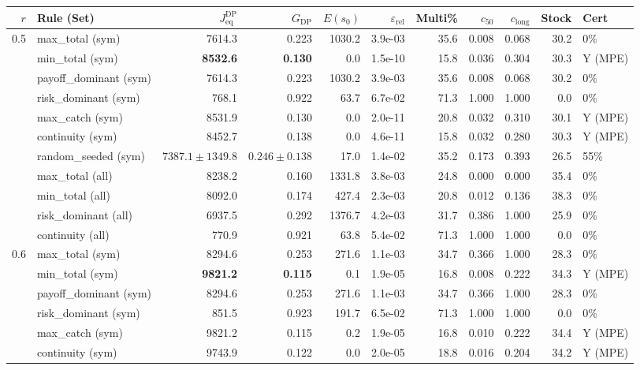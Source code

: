 \begin{tabular}{rlrrrrrrrrl}
\toprule
$r$ & Rule (Set) & $J_{\text{eq}}^{\text{DP}}$ & $G_{\text{DP}}$ & $E(s_0)$ & $\varepsilon_{\text{rel}}$ & Multi\% & $c_{50}$ & $c_{\text{long}}$ & Stock & Cert \\
\midrule
0.5 & max\_total (sym) & 7614.3 & 0.223 & 1030.2 & 3.9e-03 & 35.6 & 0.008 & 0.068 & 30.2 & 0\% \\
 & min\_total (sym) & \textbf{8532.6} & \textbf{0.130} & 0.0 & 1.5e-10 & 15.8 & 0.036 & 0.304 & 30.3 & Y (MPE) \\
 & payoff\_dominant (sym) & 7614.3 & 0.223 & 1030.2 & 3.9e-03 & 35.6 & 0.008 & 0.068 & 30.2 & 0\% \\
 & risk\_dominant (sym) & 768.1 & 0.922 & 63.7 & 6.7e-02 & 71.3 & 1.000 & 1.000 & 0.0 & 0\% \\
 & max\_catch (sym) & 8531.9 & 0.130 & 0.0 & 2.0e-11 & 20.8 & 0.032 & 0.310 & 30.1 & Y (MPE) \\
 & continuity (sym) & 8452.7 & 0.138 & 0.0 & 4.6e-11 & 15.8 & 0.032 & 0.280 & 30.3 & Y (MPE) \\
 & random\_seeded (sym) & $7387.1 \pm 1349.8$ & $0.246 \pm 0.138$ & 17.0 & 1.4e-02 & 35.2 & 0.173 & 0.393 & 26.5 & 55\% \\
 & max\_total (all) & 8238.2 & 0.160 & 1331.8 & 3.8e-03 & 24.8 & 0.000 & 0.000 & 35.4 & 0\% \\
 & min\_total (all) & 8092.0 & 0.174 & 427.4 & 2.3e-03 & 20.8 & 0.012 & 0.136 & 38.3 & 0\% \\
 & risk\_dominant (all) & 6937.5 & 0.292 & 1376.7 & 4.2e-03 & 31.7 & 0.386 & 1.000 & 25.9 & 0\% \\
 & continuity (all) & 770.9 & 0.921 & 63.8 & 5.4e-02 & 71.3 & 1.000 & 1.000 & 0.0 & 0\% \\
\midrule
0.6 & max\_total (sym) & 8294.6 & 0.253 & 271.6 & 1.1e-03 & 34.7 & 0.366 & 1.000 & 28.3 & 0\% \\
 & min\_total (sym) & \textbf{9821.2} & \textbf{0.115} & 0.1 & 1.9e-05 & 16.8 & 0.008 & 0.222 & 34.3 & Y (MPE) \\
 & payoff\_dominant (sym) & 8294.6 & 0.253 & 271.6 & 1.1e-03 & 34.7 & 0.366 & 1.000 & 28.3 & 0\% \\
 & risk\_dominant (sym) & 851.5 & 0.923 & 191.7 & 6.5e-02 & 71.3 & 1.000 & 1.000 & 0.0 & 0\% \\
 & max\_catch (sym) & 9821.2 & 0.115 & 0.2 & 1.9e-05 & 16.8 & 0.010 & 0.222 & 34.4 & Y (MPE) \\
 & continuity (sym) & 9743.9 & 0.122 & 0.0 & 2.0e-05 & 18.8 & 0.016 & 0.204 & 34.2 & Y (MPE) \\

\end{tabular}
